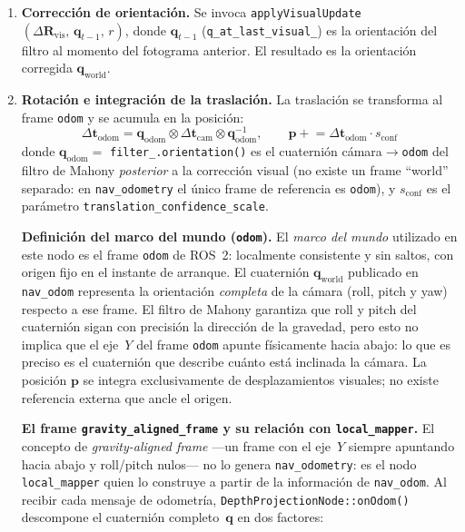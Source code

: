 \begin{itemize}
\begin{enumerate}
        descarta por no plausible.
      \item \textbf{Corrección de orientación.} Se invoca
        \texttt{applyVisualUpdate}$(\Delta\mathbf{R}_{\text{vis}},\,
        \mathbf{q}_{t-1},\, r)$, donde $\mathbf{q}_{t-1}$
        (\texttt{q\_at\_last\_visual\_}) es la orientación del filtro al momento
        del fotograma anterior. El resultado es la orientación corregida
        $\mathbf{q}_{\text{world}}$.
      \item \textbf{Rotación e integración de la traslación.} La traslación
        se transforma al frame \texttt{odom} y se acumula en la posición:
        \begin{equation}
          \label{eq:translation-integration}
          \Delta\mathbf{t}_{\text{odom}} =
            \mathbf{q}_{\text{odom}} \otimes \Delta\mathbf{t}_{\text{cam}}
            \otimes \mathbf{q}_{\text{odom}}^{-1}, \qquad
          \mathbf{p} \mathrel{+}=
            \Delta\mathbf{t}_{\text{odom}} \cdot s_{\text{conf}}
        \end{equation}
        donde $\mathbf{q}_{\text{odom}} = $ \texttt{filter\_.orientation()}
        es el cuaternión cámara$\to$\texttt{odom} del filtro de Mahony
        \emph{posterior} a la corrección visual (no existe un frame
        ``world'' separado: en \texttt{nav\_odometry} el único frame de
        referencia es \texttt{odom}), y $s_{\text{conf}}$ es el parámetro
        \texttt{translation\_confidence\_scale}.

        \textbf{Definición del marco del mundo (\texttt{odom}).}
        El \emph{marco del mundo} utilizado en este nodo es el frame
        \texttt{odom} de ROS~2: localmente consistente y sin saltos, con origen
        fijo en el instante de arranque. El cuaternión
        $\mathbf{q}_{\text{world}}$ publicado en \texttt{nav\_odom} representa
        la orientación \emph{completa} de la cámara (roll, pitch y yaw)
        respecto a ese frame. El filtro de Mahony garantiza que roll y pitch del
        cuaternión sigan con precisión la dirección de la gravedad, pero esto no
        implica que el eje~$Y$ del frame \texttt{odom} apunte físicamente
        hacia abajo: lo que es preciso es el cuaternión que describe cuánto
        está inclinada la cámara. La posición $\mathbf{p}$ se integra
        exclusivamente de desplazamientos visuales; no existe referencia externa
        que ancle el origen.

        \textbf{El frame \texttt{gravity\_aligned\_frame} y su relación con
        \texttt{local\_mapper}.}
        El concepto de \emph{gravity-aligned frame} ---un frame con el eje~$Y$
        siempre apuntando hacia abajo y roll/pitch nulos--- no lo genera
        \texttt{nav\_odometry}: es el nodo \texttt{local\_mapper} quien lo
        construye a partir de la información de \texttt{nav\_odom}. Al recibir
        cada mensaje de odometría, \texttt{DepthProjectionNode::onOdom()}
        descompone el cuaternión completo~$\mathbf{q}$ en dos factores:


\end{enumerate}
\end{itemize}

